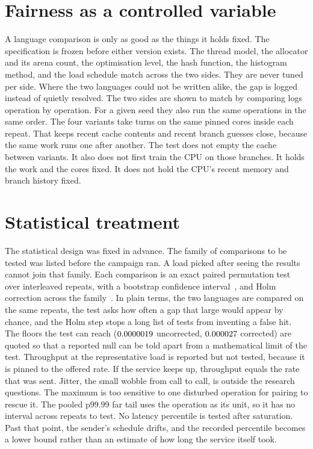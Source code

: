 \documentclass[english,oneside,a4paper,censored,csm,software-track-2020]{HYthesisML}
\begin{document}
\section{Fairness as a controlled variable}\label{sec:controlsbrief}
A language comparison is only as good as the things it holds fixed.
The specification is frozen before either version exists.
The thread model, the allocator and its arena count, the optimisation level, the hash function, the histogram method, and the load schedule match across the two sides.
They are never tuned per side.
Where the two languages could not be written alike, the gap is logged instead of quietly resolved.
The two sides are shown to match by comparing logs operation by operation.
For a given seed they also run the same operations in the same order.
The four variants take turns on the same pinned cores inside each repeat.
That keeps recent cache contents and recent branch guesses close, because the same work runs one after another.
The test does not empty the cache between variants.
It also does not first train the CPU on those branches.
It holds the work and the cores fixed.
It does not hold the CPU's recent memory and branch history fixed.

\section{Statistical treatment}\label{sec:statsbrief}
The statistical design was fixed in advance.
The family of comparisons to be tested was listed before the campaign ran.
A load picked after seeing the results cannot join that family.
Each comparison is an exact paired permutation test over \NRepeats{} interleaved repeats, with a bootstrap confidence interval~\cite{efron1993bootstrap}, and Holm correction across the family~\cite{holm1979simple}.
In plain terms, the two languages are compared on the same repeats, the test asks how often a gap that large would appear by chance, and the Holm step stops a long list of tests from inventing a false hit.
The floors the test can reach ($0.0000019$ uncorrected, $0.000027$ corrected) are quoted so that a reported null can be told apart from a mathematical limit of the test.
Throughput at the representative load is reported but not tested, because it is pinned to the offered rate. If the service keeps up, throughput equals the rate that was sent.
Jitter, the small wobble from call to call, is outside the research questions.
The maximum is too sensitive to one disturbed operation for pairing to rescue it.
The pooled p99.99 far tail uses the operation as its unit, so it has no interval across repeats to test.
No latency percentile is tested after saturation.
Past that point, the sender's schedule drifts, and the recorded percentile becomes a lower bound rather than an estimate of how long the service itself took.
\end{document}
